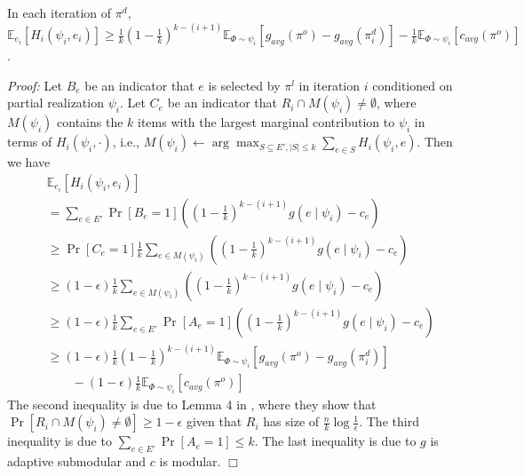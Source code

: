 \documentclass[twoside,leqno,twocolumn]{article}
\begin{document}
\begin{lemma}
\label{lem:b2}
In each iteration of $\pi^d$,
$
\mathbb{E}_{e_i}[H_i(\psi_i, e_i)] \geq \frac{1}{k}(1-\frac{1}{k})^{k-(i+1)} \mathbb{E}_{\Phi\sim \psi_i}[g_{avg}(\pi^o)-g_{avg}(\pi^d_i)]-\frac{1}{k}\mathbb{E}_{\Phi\sim \psi_i}[c_{avg}(\pi^o)]$.
\end{lemma}
\emph{Proof:} Let $B_e$ be an indicator that $e$ is selected by $\pi^l$ in iteration $i$ conditioned on partial realization $\psi_i$. Let $C_e$ be an indicator that $R_i \cap  M(\psi_i) \neq \emptyset$, where $M(\psi_i)$ contains the $k$ items with the largest marginal contribution to $\psi_i$ in terms of $H_i(\psi_i, \cdot)$, i.e., $M(\psi_i) \leftarrow \arg\max_{S\subseteq E', |S|\leq k} \sum_{e\in S} H_i(\psi_i, e)$. Then we have
\begin{eqnarray*}
&& \mathbb{E}_{e_i}[H_i(\psi_i, e_i)]  \\
&& = \sum_{e\in E'} \Pr[B_e=1] ((1-\frac{1}{k})^{k-(i+1)} g(e \mid \psi_i)-c_{e}) \\
&& \geq \Pr[C_e=1] \frac{1}{k}\sum_{e\in M(\psi_i)} ((1-\frac{1}{k})^{k-(i+1)} g(e \mid \psi_i)-c_{e})\\
&& \geq (1-\epsilon) \frac{1}{k}\sum_{e\in M(\psi_i)} ((1-\frac{1}{k})^{k-(i+1)} g(e \mid \psi_i)-c_{e})\\
&& \geq (1-\epsilon) \frac{1}{k}\sum_{e\in E'} \Pr[A_e=1] ((1-\frac{1}{k})^{k-(i+1)} g(e \mid \psi_i)-c_{e})\\
&& \geq (1-\epsilon)\frac{1}{k}(1-\frac{1}{k})^{k-(i+1)}\mathbb{E}_{\Phi\sim \psi_i}[g_{avg}(\pi^o)-g_{avg}(\pi^d_i)]\\
&& \quad\quad-(1-\epsilon)\frac{1}{k}\mathbb{E}_{\Phi\sim \psi_i}[c_{avg}(\pi^o)]
\end{eqnarray*} The second inequality is due to Lemma 4 in \cite{tang2021beyond}, where they show that $\Pr[R_i \cap  M(\psi_i) \neq \emptyset]\geq 1-\epsilon$ given that $R_i$ has size of $\frac{n}{k}\log\frac{1}{\epsilon}$. The third inequality is due to  $\sum_{e\in E'}\Pr[A_e=1]\leq k$. The last inequality is due to $g$ is adaptive submodular and $c$ is modular. $\Box$
\end{document}
